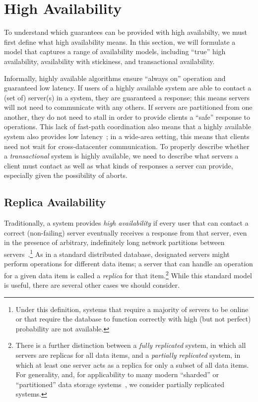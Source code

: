 
\section{High Availability}
\label{sec:availability}

To understand which guarantees can be provided with high availabilty,
we must first define what high availability means. In this section, we
will formulate a model that captures a range of availability models,
including ``true'' high availability, availability with stickiness,
and transactional availability.

Informally, highly available algorithms ensure ``always on'' operation
and guaranteed low latency. If users of a highly available system are
able to contact a (set of) server(s) in a system, they are guaranteed
a response; this means servers will not need to communicate with any
others. If servers are partitioned from one another, they do not need
to stall in order to provide clients a ``safe'' response to
operations. This lack of fast-path coordination also means that a
highly available system also provides low latency~\cite{abadi-pacelc};
in a wide-area setting, this means that clients need not wait for
cross-datacenter communication. To properly describe whether a
\textit{transactional} system is highly available, we need to describe
what servers a client must contact as well as what kinds of responses
a server can provide, especially given the possibility of aborts.

\subsection{Replica Availability}

Traditionally, a system provides {\em high availability} if every user
that can contact a correct (non-failing) server eventually receives a
response from that server, even in the presence of arbitrary,
indefinitely long network partitions between
servers~\cite{gilbert-cap}.\footnote{Under this definition, systems
  that require a majority of servers to be online or that require the
  database to function correctly with high (but not perfect)
  probability are not available.} As in a standard distributed
database, designated servers might perform operations for different
data items; a server that can handle an operation for a given data
item is called a \textit{replica} for that item.\footnote{There is a
  further distinction between a \textit{fully replicated} system, in
  which all servers are replicas for all data items, and a
  \textit{partially replicated} system, in which at least one server
  acts as a replica for only a subset of all data items. For
  generality, and, for applicability to many modern ``sharded'' or
  ``partitioned'' data storage systems~\cite{dynamo, pnuts, bigtable,
    spanner, hstore}, we consider partially replicated systems.} While
this standard model is useful, there are several other cases we should
consider.

